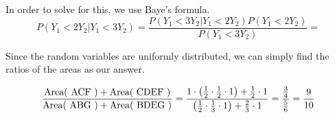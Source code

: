 \documentclass{exam}
\begin{document}
\begin{questions}
\newline
In order to solve for this, we use Baye's formula.
$$P(Y_1 < 2Y_2 | Y_1 < 3Y_2) = \frac{P(Y_1 < 3Y_2 | Y_1 < 2Y_2)P(Y_1 < 2Y_2)}{P(Y_1 < 3Y_2)} =$$

Since the random variables are uniformly distributed, we can simply find the ratios of the areas as our answer.


$$\frac{\text{Area( ACF )} + \text{Area( CDEF )}}{\text{Area( ABG )} + \text{Area( BDEG )}} = \frac{1\cdot \left( \frac{1}{2}\cdot \frac{1}{2}\cdot 1 \right) + \frac{1}{2}\cdot 1}{\left( \frac{1}{2}\cdot \frac{1}{3}\cdot 1 \right) + \frac{2}{3}\cdot 1} = \frac{\frac{3}{4}}{\frac{5}{6}} = \frac{9}{10}$$
\end{questions}
\end{document}
